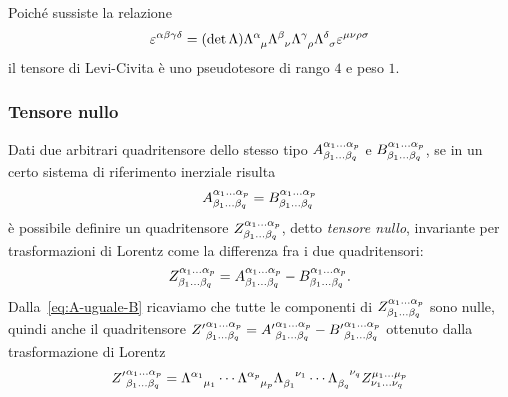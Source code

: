 Poiché sussiste la relazione
\begin{equation}
  \epsilon^{\alpha\beta\gamma\delta} = (\det\Lambda)
  \tensor{\Lambda}{^{\alpha}_{\mu}} \tensor{\Lambda}{^{\beta}_{\nu}}
  \tensor{\Lambda}{^{\gamma}_{\rho}} \tensor{\Lambda}{^{\delta}_{\sigma}}
  \epsilon^{\mu\nu\rho\sigma}
\end{equation}
il tensore di Levi-Civita è uno pseudotesore di rango $4$ e peso $1$.

\subsubsection{Tensore nullo}
\label{sec:tensore-nullo}

Dati due arbitrari quadritensore dello stesso tipo
$\tensor*{A}{^{\alpha_{1}\dots\alpha_{p}}_{\beta_{1}\dots\beta_{q}}}$ e
$\tensor*{B}{^{\alpha_{1}\dots\alpha_{p}}_{\beta_{1}\dots\beta_{q}}}$, se in un
certo sistema di riferimento inerziale risulta
\begin{equation}
  \label{eq:A-uguale-B}
  \tensor*{A}{^{\alpha_{1}\dots\alpha_{p}}_{\beta_{1}\dots\beta_{q}}} =
  \tensor*{B}{^{\alpha_{1}\dots\alpha_{p}}_{\beta_{1}\dots\beta_{q}}}
\end{equation}
è possibile definire un quadritensore
$\tensor*{Z}{^{\alpha_{1}\dots\alpha_{p}}_{\beta_{1}\dots\beta_{q}}}$, detto
\emph{tensore nullo}, invariante per trasformazioni di
Lorentz come la differenza fra i due quadritensori:
\begin{equation}
  \tensor*{Z}{^{\alpha_{1}\dots\alpha_{p}}_{\beta_{1}\dots\beta_{q}}} =
  \tensor*{A}{^{\alpha_{1}\dots\alpha_{p}}_{\beta_{1}\dots\beta_{q}}} -
  \tensor*{B}{^{\alpha_{1}\dots\alpha_{p}}_{\beta_{1}\dots\beta_{q}}}.
\end{equation}
Dalla~\eqref{eq:A-uguale-B} ricaviamo che tutte le componenti di
$\tensor*{Z}{^{\alpha_{1}\dots\alpha_{p}}_{\beta_{1}\dots\beta_{q}}}$ sono
nulle, quindi anche il quadritensore
$\tensor*{{Z'}}{^{\alpha_{1}\dots\alpha_{p}}_{\beta_{1}\dots\beta_{q}}} =
\tensor*{{A'}}{^{\alpha_{1}\dots\alpha_{p}}_{\beta_{1}\dots\beta_{q}}} -
\tensor*{{B'}}{^{\alpha_{1}\dots\alpha_{p}}_{\beta_{1}\dots\beta_{q}}}$
ottenuto dalla trasformazione di Lorentz
\begin{equation}
  \tensor*{{Z'}}{^{\alpha_{1}\dots\alpha_{p}}_{\beta_{1}\dots\beta_{q}}} =
  \tensor{\Lambda}{^{\alpha_{1}}_{\mu_{1}}} \cdots
  \tensor{\Lambda}{^{\alpha_{p}}_{\mu_{p}}}
  \tensor{\Lambda}{_{\beta_{1}}^{\nu_{1}}} \cdots
  \tensor{\Lambda}{_{\beta_{q}}^{\nu_{q}}}
  \tensor*{Z}{^{\mu_{1}\dots\mu_{p}}_{\nu_{1}\dots\nu_{q}}}
\end{equation}
